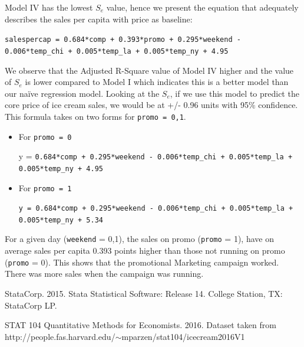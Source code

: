 \documentclass[10pt]{article}
\begin{document}
Model IV has the lowest $S_e$ value, hence we present the equation that adequately describes the sales per capita with price as baseline:

\begin{center}
{\tt salespercap = 0.684*comp + 0.393*promo + 0.295*weekend - 0.006*temp\_chi + 0.005*temp\_la + 0.005*temp\_ny + 4.95}
\end{center}

We observe that the Adjusted R-Square value of Model IV higher and the value of $S_e$ is lower compared to Model I which indicates this is a better model than our na\"{i}ve regression model. Looking at the $S_e$, if we use this model to predict the core price of ice cream sales, we would be at +/- 0.96 units with 95\% confidence. \\

This formula takes on two forms for {\tt promo = 0,1}.
\begin{itemize}
\item For {\tt promo = 0}
\begin{center}
 y = {\tt 0.684*comp + 0.295*weekend - 0.006*temp\_chi + 0.005*temp\_la + 0.005*temp\_ny + 4.95}
\end{center}
\item For {\tt promo = 1}
\begin{center}
{\tt y = 0.684*comp + 0.295*weekend - 0.006*temp\_chi + 0.005*temp\_la + 0.005*temp\_ny + 5.34}
\end{center}
\end{itemize}

For a given day ({\tt weekend} = 0,1), the sales on promo ({\tt promo} = 1), have on average sales per capita 0.393 points higher than those not running on promo ({\tt promo} = 0). This shows that the promotional Marketing campaign worked. There was more sales when the campaign was running. 

\begin{thebibliography}{9}

StataCorp. 2015. Stata Statistical Software: Release 14. College Station, TX: StataCorp LP.

STAT 104 Quantitative Methods for Economists. 2016. Dataset taken from http://people.fas.harvard.edu/$\sim$mparzen/stat104/icecream2016V1

\end{thebibliography}
\end{document}
